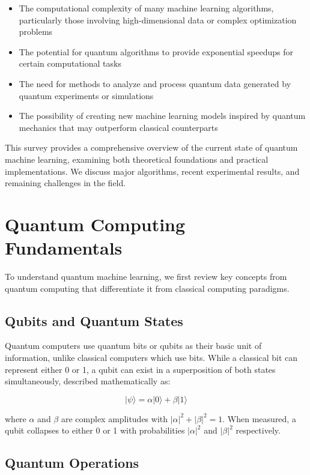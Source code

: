 \documentclass[12pt,a4paper]{article}
\begin{document}
\begin{itemize}
    \item The computational complexity of many machine learning algorithms, particularly those involving high-dimensional data or complex optimization problems
    \item The potential for quantum algorithms to provide exponential speedups for certain computational tasks
    \item The need for methods to analyze and process quantum data generated by quantum experiments or simulations
    \item The possibility of creating new machine learning models inspired by quantum mechanics that may outperform classical counterparts
\end{itemize}

This survey provides a comprehensive overview of the current state of quantum machine learning, examining both theoretical foundations and practical implementations. We discuss major algorithms, recent experimental results, and remaining challenges in the field.

\section{Quantum Computing Fundamentals}

To understand quantum machine learning, we first review key concepts from quantum computing that differentiate it from classical computing paradigms.

\subsection{Qubits and Quantum States}

Quantum computers use quantum bits or qubits as their basic unit of information, unlike classical computers which use bits. While a classical bit can represent either 0 or 1, a qubit can exist in a superposition of both states simultaneously, described mathematically as:

\begin{equation}
|\psi\rangle = \alpha|0\rangle + \beta|1\rangle
\end{equation}

where $\alpha$ and $\beta$ are complex amplitudes with $|\alpha|^2 + |\beta|^2 = 1$. When measured, a qubit collapses to either 0 or 1 with probabilities $|\alpha|^2$ and $|\beta|^2$ respectively.

\subsection{Quantum Operations}
\end{document}
